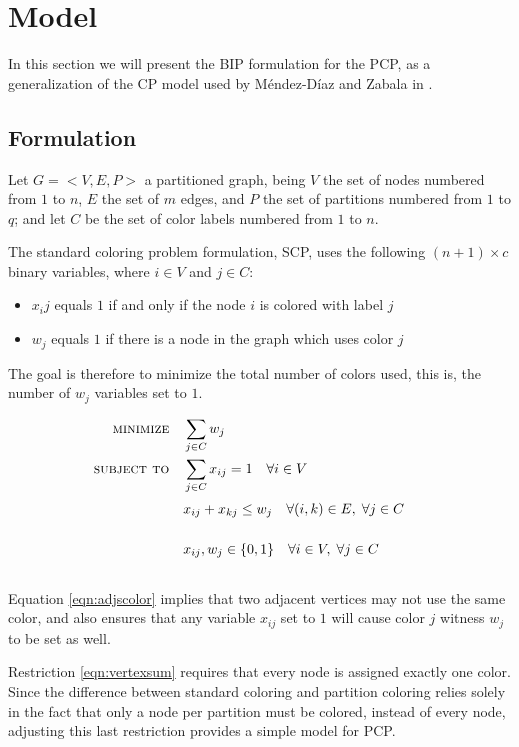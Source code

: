 
\section{Model}

In this section we will present the BIP formulation for the PCP, as a generalization of the CP model used by M\'endez-D\'iaz and Zabala in \cite{mendez2008cutting}.

\subsection{Formulation}
\label{subsec:model:formulation}

Let $G = <V,E,P>$ a partitioned graph, being $V$ the set of nodes numbered from $1$ to $n$, $E$ the set of $m$ edges, and $P$ the set of partitions numbered from $1$ to $q$; and let $C$ be the set of color labels numbered from $1$ to $n$.

The standard coloring problem formulation, SCP, uses the following $(n + 1) \times c$ binary variables, where $i \in V$ and $j \in C$:
\begin{itemize}
\item $x_ij$ equals $1$ if and only if the node $i$ is colored with label $j$
\item $w_j$ equals $1$ if there is a node in the graph which uses color $j$
\end{itemize}

The goal is therefore to minimize the total number of colors used, this is, the number of $w_j$ variables set to $1$.

\begin{align}
\text{\textsc{minimize}} \quad & \sum_{j \in C} w_j \nonumber \\
\text{\textsc{subject to}} \quad & \sum_{j \in C} x_{ij} = 1 \quad \forall i \in V \label{eqn:vertexsum} \\
& x_{ij} + x_{kj} \leq w_j \quad \forall (i,k) \in E, \; \forall j \in C \sumheight \label{eqn:adjscolor}\\
& x_{ij}, w_{j} \in \{0,1\} \quad \forall i \in V, \; \forall j \in C \sumheight \nonumber
\end{align}

Equation \ref{eqn:adjscolor} implies that two adjacent vertices may not use the same color, and also ensures that any variable $x_{ij}$ set to $1$ will cause color $j$ witness $w_j$ to be set as well.

Restriction \ref{eqn:vertexsum} requires that every node is assigned exactly one color. Since the difference between standard coloring and partition coloring relies solely in the fact that only a node per partition must be colored, instead of every node, adjusting this last restriction provides a simple model for PCP.

